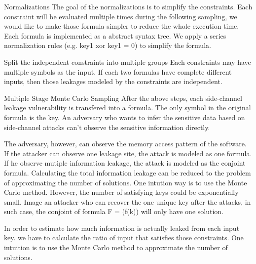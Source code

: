 Normalizations
The goal of the normalizations is to simplify the constraints. 
Each constraint will be evaluated multiple times during the following sampling, 
we would like to make those formula simpler to reduce the whole execution time.  
Each formula is implemented as a abstract syntax tree. We apply a series normalization
rules (e.g. key1 xor key1 = 0) to simplify the formula.


Split the independent constraints into multiple groups
Each constraints may have multiple symbols as the input. 
If each two formulas have complete different inputs,
then those leakages modeled by the constraints are independent. 

Multiple Stage Monte Carlo Sampling
After the above steps, each side-channel leakage vulnerability is 
transfered into a formula. The only symbol in the original formula is the key. 
An adversary who wants to infer the sensitive data based on side-channel 
attacks can’t observe the sensitive information directly. 

The adversary, however, can observe the memory access pattern of the software. 
If the attacker can observe one leakage site, the attack is modeled as one formula. 
If he observe mutiple information leakage, the attack is modeled as the conjoint formula.
Calculating the total information leakage can be reduced to the problem of approximating 
the number of solutions. One intution way is to use the Monte Carlo method. However, 
the number of satisfying keys could be exponentially small. Image an attacker 
who can recover the one unique key after the attacks, in such case, 
the conjoint of formula F = (f(k)) will only have one solution.

In order to estimate how much information is actually leaked from each input key.
we have to calculate the ratio of input that satisfies those constraints. 
One intuition is to use the Monte Carlo method to approximate the number of solutions. 